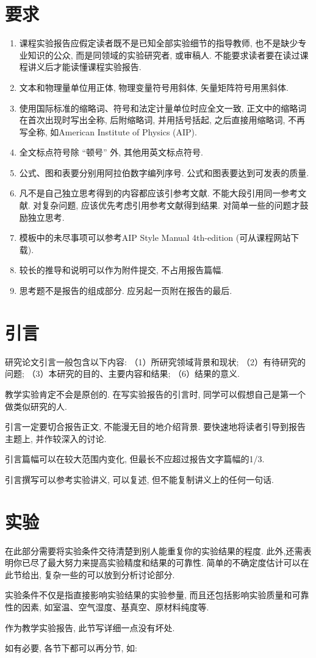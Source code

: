 \documentclass[12pt,a4paper]{article}
\begin{document}
\begin{spacing}{2}
\section{要求}
\begin{enumerate}
\item 课程实验报告应假定读者既不是已知全部实验细节的指导教师, 也不是缺少专业知识的公众, 而是同领域的实验研究者, 或审稿人. 不能要求读者要在读过课程讲义后才能读懂课程实验报告.
\item 文本和物理量单位用正体, 物理变量符号用斜体, 矢量矩阵符号用黑斜体.
\item 使用国际标准的缩略词、符号和法定计量单位时应全文一致, 正文中的缩略词在首次出现时写出全称, 后附缩略词, 并用括号括起, 之后直接用缩略词, 不再写全称, 如American Institute of Physics (AIP).
\item 全文标点符号除 “顿号” 外, 其他用英文标点符号.
\item 公式、图和表要分别用阿拉伯数字编列序号. 公式和图表要达到可发表的质量.
\item 凡不是自己独立思考得到的内容都应该引参考文献. 不能大段引用同一参考文献. 对复杂问题, 应该优先考虑引用参考文献得到结果. 对简单一些的问题才鼓励独立思考.
\item 模板中的未尽事项可以参考AIP Style Manual 4th-edition (可从课程网站下载).
\item 较长的推导和说明可以作为附件提交, 不占用报告篇幅.
\item 思考题不是报告的组成部分. 应另起一页附在报告的最后.
\end{enumerate}

\section{引言}
研究论文引言一般包含以下内容: （1）所研究领域背景和现状; （2）有待研究的问题; （3）本研究的目的、主要内容和结果; （6）结果的意义.\par
教学实验肯定不会是原创的. 在写实验报告的引言时, 同学可以假想自己是第一个做类似研究的人.\par
引言一定要切合报告正文, 不能漫无目的地介绍背景. 要快速地将读者引导到报告主题上, 并作较深入的讨论.\par
引言篇幅可以在较大范围内变化, 但最长不应超过报告文字篇幅的1/3.\par
引言撰写可以参考实验讲义, 可以复述, 但不能复制讲义上的任何一句话.\par

\section{实验}
在此部分需要将实验条件交待清楚到别人能重复你的实验结果的程度. 此外,还需表明你已尽了最大努力来提高实验精度和结果的可靠性. 简单的不确定度估计可以在此节给出, 复杂一些的可以放到分析讨论部分.\par
实验条件不仅是指直接影响实验结果的实验参量, 而且还包括影响实验质量和可靠性的因素, 如室温、空气湿度、基真空、原材料纯度等.\par
作为教学实验报告, 此节写详细一点没有坏处.\par
如有必要, 各节下都可以再分节, 如: 

\end{spacing}
\end{document}
